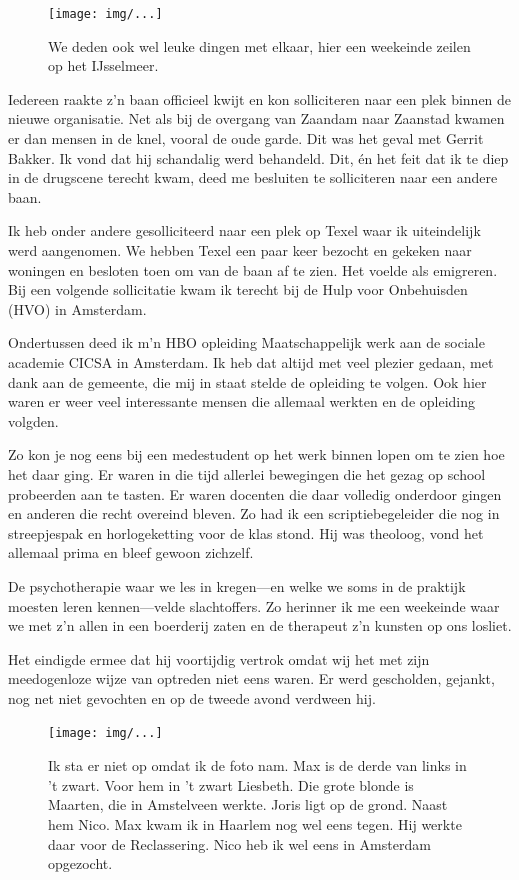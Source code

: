 \documentclass[12pt,twoside, openright]{memoir}
\begin{document}
\begin{figure}[t]
\texttt{[image: img/...]}
\caption{We deden ook wel leuke dingen met elkaar, hier een weekeinde zeilen op het IJsselmeer.}
\end{figure}

Iedereen raakte z’n baan officieel kwijt en kon solliciteren naar een plek binnen de nieuwe organisatie. Net als bij de overgang van Zaandam naar Zaanstad kwamen er dan mensen in de knel, vooral de oude garde. Dit was het geval met Gerrit Bakker. Ik vond dat hij schandalig werd behandeld. Dit, én het feit dat ik te diep in de drugscene terecht kwam, deed me besluiten te solliciteren naar een andere baan. 

Ik heb onder andere gesolliciteerd naar een plek op Texel waar ik uiteindelijk werd aangenomen. We hebben Texel een paar keer bezocht en gekeken naar woningen en besloten toen om van de baan af te zien. Het voelde als emigreren. Bij een volgende sollicitatie kwam ik terecht bij de Hulp voor Onbehuisden (HVO) in Amsterdam.

Ondertussen deed ik m’n HBO opleiding Maatschappelijk werk aan de sociale academie CICSA in Amsterdam. Ik heb dat altijd met veel plezier gedaan, met dank aan de gemeente, die mij in staat stelde de opleiding te volgen. Ook hier waren er weer veel interessante mensen die allemaal werkten en de opleiding volgden. 

Zo kon je nog eens bij een medestudent op het werk binnen lopen om te zien hoe het daar ging. Er waren in die tijd allerlei bewegingen die het gezag op school probeerden aan te tasten. Er waren docenten die daar volledig onderdoor gingen en anderen die recht overeind bleven. Zo had ik een scriptiebegeleider die nog in streepjespak en horlogeketting voor de klas stond. Hij was theoloog, vond het allemaal prima en bleef gewoon zichzelf. 

De psychotherapie waar we les in kregen---en welke we soms in de praktijk moesten leren kennen---velde slachtoffers. Zo herinner ik me een weekeinde waar we met z’n allen in een boerderij zaten en de therapeut z’n kunsten op ons losliet. 

Het eindigde ermee dat hij voortijdig vertrok omdat wij het met zijn meedogenloze wijze van optreden niet eens waren. Er werd gescholden, gejankt, nog net niet gevochten en op de tweede avond verdween hij.

\begin{figure}[t]
\texttt{[image: img/...]}
\caption{Ik sta er niet op omdat ik de foto nam. Max is de derde van links in ’t zwart. Voor hem in ’t zwart Liesbeth. Die grote blonde is Maarten, die in Amstelveen werkte. Joris ligt op de grond. Naast hem Nico. Max kwam ik in Haarlem nog wel eens tegen. Hij werkte daar voor de Reclassering. Nico heb ik wel eens in Amsterdam opgezocht.}
\end{figure}
\end{document}
